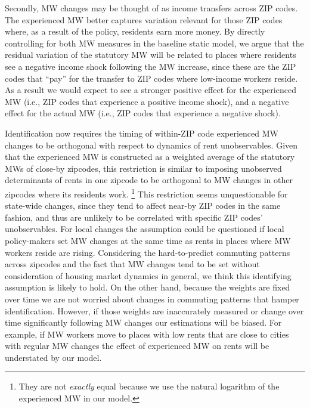 Secondly, MW changes may be thought of as income transfers across ZIP codes. The experienced MW 
better captures variation relevant for those ZIP codes where, as a result of the policy, residents 
earn more money. By directly controlling for both MW measures in the baseline static model, we argue 
that the residual variation of the statutory MW will be related to places where residents see a 
negative income shock following the MW increase, since these are the ZIP codes that ``pay'' for the 
transfer to ZIP codes where low-income workers reside. As a result we would expect to see a stronger 
positive effect for the experienced MW (i.e., ZIP codes that experience a positive income shock), 
and a negative effect for the actual MW (i.e., ZIP codes that experience a negative shock).

Identification now requires the timing of within-ZIP code experienced MW changes to be orthogonal 
with respect to dynamics of rent unobservables. Given that the experienced MW is constructed as a 
weighted average of the statutory MWs of close-by zipcodes, this restriction is similar to imposing 
unobserved determinants of rents in one zipcode to be orthogonal to MW changes in other zipcodes 
where its residents work. \footnote{They are not \textit{exactly} equal because we use the natural 
	logarithm of the experienced MW in our model.}
This restriction seems unquestionable for state-wide changes, since they tend to affect near-by ZIP 
codes in the same fashion, and thus are unlikely to be correlated with specific ZIP codes' unobservables. 
For local changes the assumption could be questioned if local policy-makers set MW changes at 
the same time as rents in places where MW workers reside are rising. Considering the hard-to-predict 
commuting patterns across zipcodes and the fact that MW changes tend to be set without consideration 
of housing market dynamics in general, we think this identifying assumption is likely to hold. On the 
other hand, because the weights are fixed over time we are not worried about changes in commuting 
patterns that hamper identification. However, if those weights are inaccurately measured or change 
over time significantly following MW changes our estimations will be biased. For example, if MW workers 
move to places with low rents that are close to cities with regular MW changes the effect of 
experienced MW on rents will be understated by our model.

